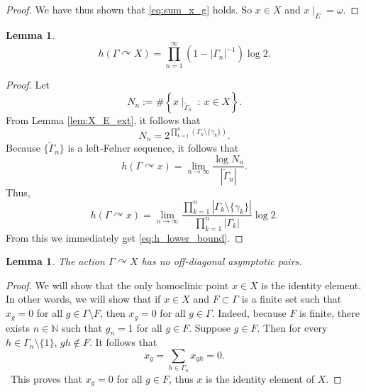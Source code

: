 \documentclass[oneside,english]{amsart}
\newtheorem{lem}[thm]{Lemma}
\theoremstyle{definition}
\newcommand{\act}[2]{{#1} \curvearrowright {#2}}
\begin{document}
\begin{proof}
We have thus shown that  \eqref{eq:sum_x_g} holds. So $x \in X$ and $x\mid_E = \omega$.
\end{proof}
\begin{lem}\label{lem:X_alg_lower_bound}
\begin{equation}\label{eq:h_lower_bound}
h(\act{\Gamma}{X}) = \prod_{n=1}^\infty(1 - |\Gamma_n|^{-1})\log 2.
\end{equation}
\end{lem}
\begin{proof}
Let
$$ N_n := \# \left\{ x\mid_{\tilde \Gamma_n} ~:~ x \in X\right\}.$$
From  Lemma \ref{lem:X_E_ext}, it follows that
$$ N_n = 2^{\prod_{k=1}^n(\Gamma_k \setminus \{\gamma_k\})}.$$
Because $\{\tilde \Gamma_n\}$ is a left-F{\o}lner sequence, it follows that
$$h(\act{\Gamma}{x})  =  \lim_{n \to \infty} \frac{\log N_n}{|\tilde \Gamma_n|}.$$
Thus,
$$h(\act{\Gamma}{x}) =\lim_{n \to \infty}\frac{\prod_{k=1}^n\left|\Gamma_k \setminus \{\gamma_k\} \right|}{\prod_{k=1}^n |\Gamma_k|} \log 2 .$$
From this we immediately get  \eqref{eq:h_lower_bound}.
\end{proof}


\begin{lem}\label{lem:X_alg_no_asymp}
The action $\act{\Gamma}{X}$ has no off-diagonal asymptotic pairs.
\end{lem}
\begin{proof}
We will show that the only homoclinic point $x \in X$ is the identity element.
In other words, we will show that if $x \in X$ and $F \subset \Gamma$ is a finite set such that
$x_g = 0$ for all $g \in \Gamma \setminus F$, then $x_g =0$ for all $g \in \Gamma$.
Indeed, because $F$ is finite, there exists $n \in \mathbb{N}$ such that $g_n = 1$ for all $g \in F$. Suppose $g \in F$.
Then for every $h \in \Gamma_n \setminus \{1\}$, $gh \not\in F$.
It follows that
$$x_g = \sum_{h \in \Gamma_n} x_{gh} =0.$$\
This proves that $x_g =0$ for all $g \in F$, thus $x$ is the identity element of $X$.
\end{proof}
\end{document}
